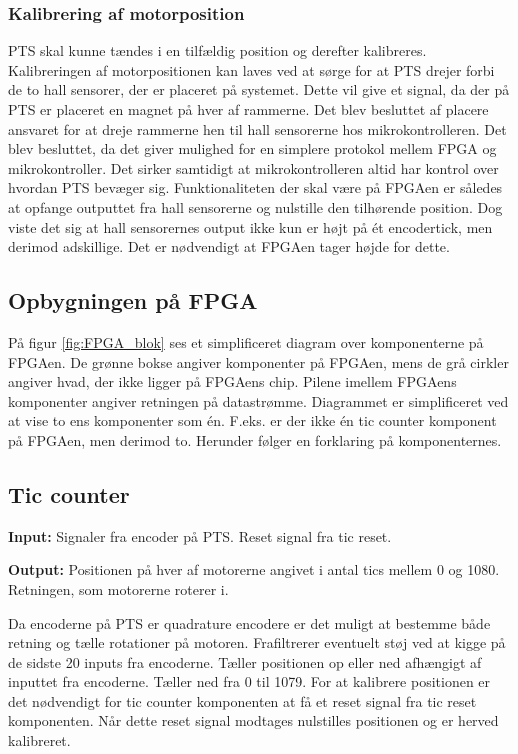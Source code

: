 \subsubsection*{Kalibrering af motorposition}
PTS skal kunne tændes i en tilfældig position og derefter kalibreres.
Kalibreringen af motorpositionen kan laves ved at sørge for at PTS drejer forbi 
de to hall sensorer, der er placeret på systemet. Dette vil give et signal, da 
der på PTS er placeret en magnet på hver af rammerne.
Det blev besluttet af placere ansvaret for at dreje rammerne hen til hall 
sensorerne hos mikrokontrolleren. Det blev besluttet, da det giver mulighed for 
en simplere protokol mellem FPGA og mikrokontroller. Det sirker samtidigt at mikrokontrolleren 
altid har kontrol over hvordan PTS bevæger sig.
Funktionaliteten der skal være på FPGAen er således at opfange outputtet fra 
hall sensorerne og nulstille den tilhørende position.
Dog viste det sig at hall sensorernes output ikke kun er højt på ét encodertick, 
men derimod adskillige. Det er nødvendigt at FPGAen tager højde for 
dette.

\subsection{Opbygningen på FPGA}
På figur \ref{fig:FPGA_blok} ses et simplificeret diagram over komponenterne på FPGAen. 
De grønne bokse angiver komponenter på FPGAen, mens de grå cirkler angiver hvad, der ikke ligger på 
FPGAens chip. Pilene imellem FPGAens komponenter angiver retningen på 
datastrømme. Diagrammet er simplificeret ved at vise to ens komponenter som én. 
F.eks. er der ikke én tic counter komponent på FPGAen, men derimod to.
Herunder følger en forklaring på komponenternes.


\subsection*{Tic counter}
\textbf{Input:}
Signaler fra encoder på PTS. Reset signal fra tic reset.

\textbf{Output:} Positionen på hver af motorerne angivet i antal tics mellem 0 
og 1080. Retningen, som motorerne roterer i. 

Da encoderne på PTS er quadrature encodere er det muligt at bestemme både retning og 
tælle rotationer på motoren.
Frafiltrerer eventuelt støj ved at kigge på de sidste 20 inputs fra encoderne.
Tæller positionen op eller ned afhængigt af inputtet fra encoderne. 
Tæller ned fra 0 til 1079.
For at kalibrere positionen er det nødvendigt for tic counter komponenten at få 
et reset signal fra tic reset komponenten. 
Når dette reset signal modtages nulstilles positionen og er herved kalibreret.

